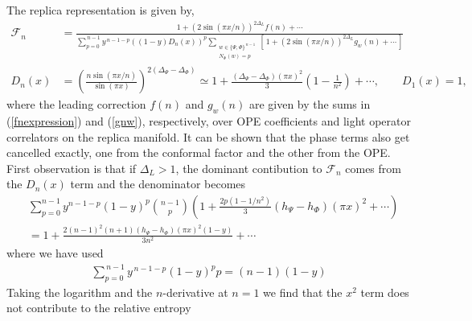 \documentclass[11pt]{article}
\newcommand{\nn}{\nonumber}
\newcommand{\lb}{\left(}
\newcommand{\rb}{\right)}
\newcommand{\JM}[1]{\textcolor{orange}{#1}}
\begin{document}
The replica representation is given by,
  \begin{align}
    \label{eq:F_n_mixed}\mathcal{F}_{n} & =\frac{\,1+(2\sin(\pi x/n))^{2\Delta_L}f(n)+\cdots\,}{\displaystyle \sum_{p=0}^{\,n-1}y^{\,n-1-p}((1-y)D_n(x))^{p}\sum_{\substack{w\in\{\Psi,\Phi\}^{\,n-1}\\ N_\Phi(w)=p}}\left[\,1+(2\sin(\pi x/n))^{2\Delta_L}g_{w}(n)+\cdots\,\right] }\\
    \label{Dn_mixed}
    D_{n}(x)&=\left(\frac{n\sin(\pi x/n)}{\sin(\pi x)}\right)^{2(\Delta_\Psi-\Delta_\Phi)}\simeq 1+\frac{(\Delta_\Psi-\Delta_\Phi)(\pi x)^2}{3}\lb 1-\frac{1}{n^2}\rb+\cdots 
    ,\qquad D_{1}(x)=1,
  \end{align}
  where the leading correction $f(n)$ and $g_w(n)$ are given by the sums in (\ref{fnexpression}) and (\ref{gnw}), respectively, over OPE coefficients and light operator correlators on the replica manifold. It can be shown that the phase terms also get cancelled exactly, one from the conformal factor and the other from the OPE. First observation is that if $\Delta_L> 1$, the dominant contibution to $\mathcal{F}_n$ comes from the $D_n(x)$ term and the denominator becomes 
  \begin{align}
    &\sum_{p=0}^{n-1} y^{n-1-p}(1-y)^p\binom{n-1}{p}\lb 1+\frac{2p(1-1/n^2)}{3}(h_\Psi-h_\Phi)(\pi x)^2+\cdots\rb\nn\\
    &=1+\frac{2(n-1)^2(n+1)(h_\Psi-h_\Phi)(\pi x)^2(1-y)}{3n^2}+\cdots 
  \end{align}
  where we have used 
  \begin{align}
  \sum_{p=0}^{\,n-1}y^{\,n-1-p}(1-y)^{p}p = (n-1)(1-y)
  \end{align}
Taking the logarithm and the $n$-derivative at $n=1$ we find that the $x^2$ term does not contribute to the relative entropy
\end{document}
